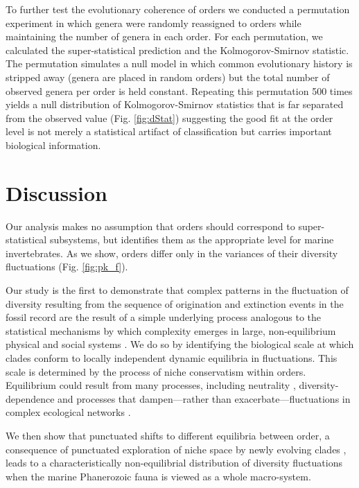 \documentclass[12pt]{article}
\let\citep=\cite
\begin{document}
To further test the evolutionary coherence of orders we conducted a
permutation experiment in which genera were randomly reassigned to
orders while maintaining the number of genera in each order. For each
permutation, we calculated the super-statistical prediction and the
Kolmogorov-Smirnov statistic. The permutation simulates a null model
in which common evolutionary history is stripped away (genera are
placed in random orders) but the total number of observed genera per
order is held constant.  Repeating this permutation 500 times yields a
null distribution of Kolmogorov-Smirnov statistics that is far
separated from the observed value (Fig. \ref{fig:dStat}) suggesting
the good fit at the order level is not merely a statistical artifact
of classification but carries important biological information.

\section*{Discussion}

Our analysis makes no assumption that orders should correspond to
super-statistical subsystems, but identifies them as the appropriate
level for marine invertebrates. As we show, orders differ only in the
variances of their diversity fluctuations (Fig. \ref{fig:pk_f}).

Our study is the first to demonstrate that complex patterns in the
fluctuation of diversity resulting from the sequence of origination
and extinction events in the fossil record are the result of a simple
underlying process analogous to the statistical mechanisms by which
complexity emerges in large, non-equilibrium physical \citep{beck2004}
and social systems \citep{fuentes2009}.  We do so by identifying the
biological scale at which clades conform to locally independent
dynamic equilibria in fluctuations. This scale is determined by the
process of niche conservatism \citep{roy2009range, hopkins2014} within
orders.  Equilibrium could result from many processes, including
neutrality \citep{macWilson, hubbell2001}, diversity-dependence
\citep{gavrilets2005, rabosky2009ecolLett} and processes that
dampen---rather than exacerbate---fluctuations in complex ecological
networks \citep{berlow2009}. 

We then show that punctuated shifts to different equilibria between
order, a consequence of punctuated exploration of niche space by newly
evolving clades \citep{eldredgeGould1972, newman1985adaptive,
  hopkins2014}, leads to a characteristically non-equilibrial
distribution of diversity fluctuations when the marine Phanerozoic
fauna is viewed as a whole macro-system.
\end{document}
